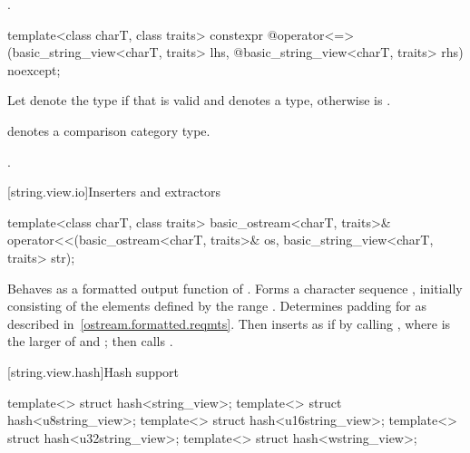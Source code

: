 \begin{itemdescr}
\pnum
\returns
{}.
\end{itemdescr}

%
\begin{itemdecl}
template<class charT, class traits>
  constexpr @\seebelow@ operator<=>(basic_string_view<charT, traits> lhs,
            @\itcorr@                      basic_string_view<charT, traits> rhs) noexcept;
\end{itemdecl}

\begin{itemdescr}
\pnum
Let  denote the type  if
that  is valid and denotes a type,
otherwise  is .

\pnum
\mandates
{} denotes a comparison category type.

\pnum
\returns
{}.
\end{itemdescr}

[string.view.io]{Inserters and extractors}

%
\begin{itemdecl}
template<class charT, class traits>
  basic_ostream<charT, traits>&
    operator<<(basic_ostream<charT, traits>& os, basic_string_view<charT, traits> str);
\end{itemdecl}

\begin{itemdescr}
\pnum
\effects
Behaves as a formatted output
function of . Forms a character sequence
, initially consisting of the elements defined by the range
. Determines padding for 
as described in~\ref{ostream.formatted.reqmts}.
Then inserts  as if by calling
, where  is the larger
of  and ;
then calls .

\pnum
\returns
{}
\end{itemdescr}

[string.view.hash]{Hash support}

%
%
%
%
%
\begin{itemdecl}
template<> struct hash<string_view>;
template<> struct hash<u8string_view>;
template<> struct hash<u16string_view>;
template<> struct hash<u32string_view>;
template<> struct hash<wstring_view>;
\end{itemdecl}

